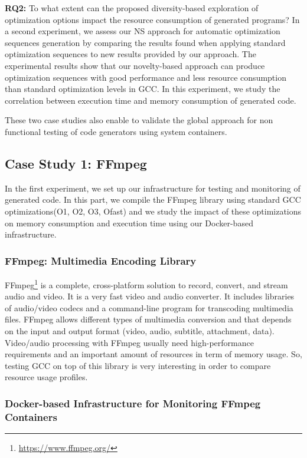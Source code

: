 \textbf{RQ2:} To what extent can the proposed diversity-based exploration of optimization options impact the resource consumption of generated programs?
In a second experiment, we assess our NS approach for automatic optimization sequences generation by comparing the results found when applying standard optimization sequences to new results provided by our approach. The experimental results show that our novelty-based approach can produce optimization sequences with good performance and less resource consumption
than standard optimization levels in GCC. In this experiment, we study the correlation between execution time and memory consumption of generated code.

These two case studies  also enable to validate the global approach for non functional testing of code generators using system containers. 



\subsection{Case Study 1: FFmpeg}
In the first experiment, we set up our infrastructure for testing and monitoring of generated code. In this part, we compile the FFmpeg library using standard GCC optimizations(O1, O2, O3, Ofast) and we study the impact of these optimizations on memory consumption and execution time using our Docker-based infrastructure.

\subsubsection{FFmpeg: Multimedia Encoding Library}
FFmpeg\footnote{\url{https://www.ffmpeg.org/}} is a complete, cross-platform solution to record, convert, and stream audio and video. It is a very fast video and audio converter. It includes libraries of audio/video codecs and a command-line program for transcoding multimedia files. FFmpeg allows different types of multimedia conversion and that depends on the input and output format (video, audio, subtitle, attachment, data). Video/audio processing with FFmpeg usually need high-performance requirements and an important amount of resources in term of memory usage. So, testing GCC on top of this library is very interesting in order to compare resource usage profiles. 
\subsubsection{Docker-based Infrastructure for Monitoring FFmpeg Containers}


